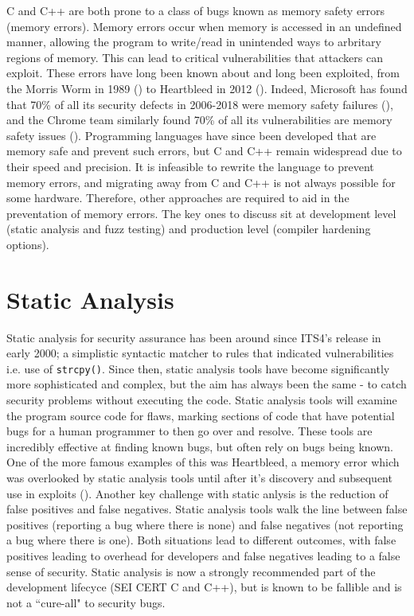C and C++ are both prone to a class of bugs known as memory safety errors (memory errors). 
Memory errors occur when memory is accessed in an undefined manner, allowing the program to write/read in unintended ways to arbritary regions of memory.
This can lead to critical vulnerabilities that attackers can exploit. 
These errors have long been known about and long been exploited, from the Morris Worm in 1989 (\cite{don1989morris}) to Heartbleed in 2012 (\cite{giac2014heartbleed}).
Indeed, Microsoft has found that 70\% of all its security defects in 2006-2018 were memory safety failures  (\cite{microsoft70}), and the Chrome team similarly found 70\% of all its vulnerabilities are memory safety issues  (\cite{chrome70}).  %
Programming languages have since been developed that are memory safe and prevent such errors, but C and C++ remain widespread due to their speed and precision. 
It is infeasible to rewrite the language to prevent memory errors, and migrating away from C and C++ is not always possible for some hardware. 
Therefore, other approaches are required to aid in the preventation of memory errors. 
The key ones to discuss sit at development level (static analysis and fuzz testing) and production level (compiler hardening options).

\section{Static Analysis}

Static analysis for security assurance has been around since ITS4's release in early 2000; a simplistic syntactic matcher to rules that indicated vulnerabilities i.e. use of \texttt{strcpy()}\cite{??}.
Since then, static analysis tools have become significantly more sophisticated and complex, but the aim has always been the same - to catch security problems without executing the code. 
Static analysis tools will examine the program source code for flaws, marking sections of code that have potential bugs for a human programmer to then go over and resolve. 
These tools are incredibly effective at finding known bugs, but often rely on bugs being known. 
One of the more famous examples of this was Heartbleed, a memory error which was overlooked by static analysis tools until after it's discovery and subsequent use in exploits (\cite{giac2014heartbleed}).
Another key challenge with static anlysis is the reduction of false positives and false negatives. 
Static analysis tools walk the line between false positives (reporting a bug where there is none) and false negatives (not reporting a bug where there is one). 
Both situations lead to different outcomes, with false positives leading to overhead for developers and false negatives leading to a false sense of security. 
Static analysis is now a strongly recommended part of the development lifecyce (SEI CERT C and C++), but is known to be fallible and is not a ``cure-all" to security bugs.

